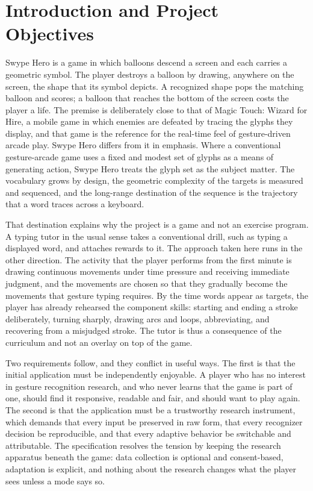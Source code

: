\chapter{Introduction and Project Objectives}\label{ch:intro}

Swype Hero is a game in which balloons descend a screen and each carries a geometric symbol. The player destroys a balloon by drawing, anywhere on the screen, the shape that its symbol depicts. A recognized shape pops the matching balloon and scores; a balloon that reaches the bottom of the screen costs the player a life. The premise is deliberately close to that of Magic Touch: Wizard for Hire, a mobile game in which enemies are defeated by tracing the glyphs they display, and that game is the reference for the real-time feel of gesture-driven arcade play. Swype Hero differs from it in emphasis. Where a conventional gesture-arcade game uses a fixed and modest set of glyphs as a means of generating action, Swype Hero treats the glyph set as the subject matter. The vocabulary grows by design, the geometric complexity of the targets is measured and sequenced, and the long-range destination of the sequence is the trajectory that a word traces across a keyboard.

That destination explains why the project is a game and not an exercise program. A typing tutor in the usual sense takes a conventional drill, such as typing a displayed word, and attaches rewards to it. The approach taken here runs in the other direction. The activity that the player performs from the first minute is drawing continuous movements under time pressure and receiving immediate judgment, and the movements are chosen so that they gradually become the movements that gesture typing requires. By the time words appear as targets, the player has already rehearsed the component skills: starting and ending a stroke deliberately, turning sharply, drawing arcs and loops, abbreviating, and recovering from a misjudged stroke. The tutor is thus a consequence of the curriculum and not an overlay on top of the game.

Two requirements follow, and they conflict in useful ways. The first is that the initial application must be independently enjoyable. A player who has no interest in gesture recognition research, and who never learns that the game is part of one, should find it responsive, readable and fair, and should want to play again. The second is that the application must be a trustworthy research instrument, which demands that every input be preserved in raw form, that every recognizer decision be reproducible, and that every adaptive behavior be switchable and attributable. The specification resolves the tension by keeping the research apparatus beneath the game: data collection is optional and consent-based, adaptation is explicit, and nothing about the research changes what the player sees unless a mode says so.

